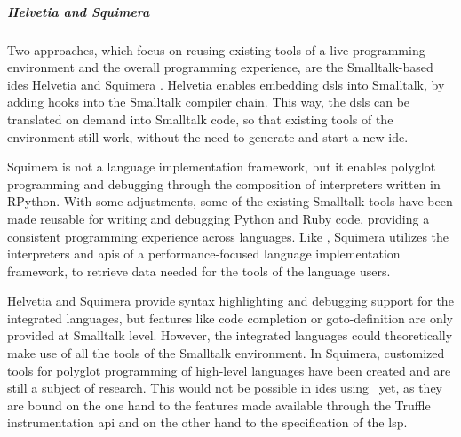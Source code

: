     
    \subparagraph{Helvetia and Squimera}
    Two approaches, which focus on reusing existing tools of a live programming environment and the overall programming experience, are the Smalltalk-based \acp{ide} Helvetia \cite{renggli2010embedding} and Squimera \cite{niephaus2018live}. Helvetia enables embedding \acp{dsl} into Smalltalk, by adding hooks into the Smalltalk compiler chain. This way, the \acp{dsl} can be translated on demand into Smalltalk code, so that existing tools of the environment still work, without the need to generate and start a new \ac{ide}.
    
    Squimera is not a language implementation framework, but it enables polyglot programming and debugging through the composition of interpreters written in RPython. With some adjustments, some of the existing Smalltalk tools have been made reusable for writing and debugging Python and Ruby code, providing a consistent programming experience across languages. Like \graallsp, Squimera utilizes the interpreters and \acp{api} of a performance-focused language implementation framework, to retrieve data needed for the tools of the language users.

    Helvetia and Squimera provide syntax highlighting and debugging support for the integrated languages, but features like code completion or goto-definition are only provided at Smalltalk level. However, the integrated languages could theoretically make use of all the tools of the Smalltalk environment. In Squimera, customized tools for polyglot programming of high-level languages have been created and are still a subject of research. This would not be possible in \acp{ide} using \graallsp~yet, as they are bound on the one hand to the features made available through the Truffle instrumentation \ac{api} and on the other hand to the specification of the \ac{lsp}.
    
